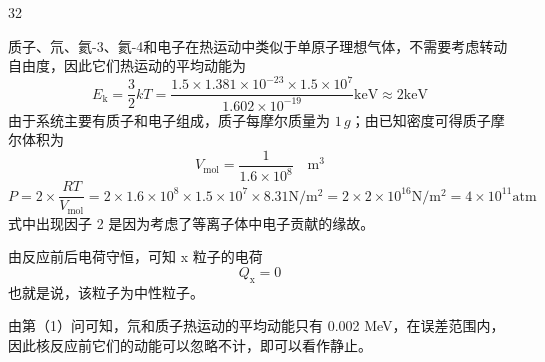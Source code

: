 \begin{solution}{32}
  \begin{subsolution}
    质子、氘、氦-3、氦-4和电子在热运动中类似于单原子理想气体，不需要考虑转动自由度，因此它们热运动的平均动能为
    \begin{equation}
      E_{\mathrm{k}} = \frac{3}{2} k T = \frac{1.5 \times 1.381 \times 10^{-23} \times 1.5 \times 10^{7}}{1.602 \times 10^{-19}} \mathrm{keV} \approx 2 \mathrm{keV}
      \label{eq:1.p32}
    \end{equation}
    由于系统主要有质子和电子组成，质子每摩尔质量为 $1 \, g$；由已知密度可得质子摩尔体积为
    \begin{equation}
      V_{\mathrm{mol}} = \frac{1}{1.6 \times 10^{8}} \quad \mathrm{m}^{3}
      \label{eq:2.p32}
    \end{equation}
    \begin{equation}
      P = 2 \times \frac{R T}{V_{\mathrm{mol}}} = 2 \times 1.6 \times 10^{8} \times 1.5 \times 10^{7} \times 8.31 \mathrm{N} / \mathrm{m}^{2} = 2 \times 2 \times 10^{16} \mathrm{N} / \mathrm{m}^{2} = 4 \times 10^{11} \mathrm{atm}
      \label{eq:3.p32}
    \end{equation}
    式中出现因子 2 是因为考虑了等离子体中电子贡献的缘故。
  \end{subsolution}
  \begin{subsolution}
    由反应前后电荷守恒，可知 x 粒子的电荷
    \begin{equation}
      Q_{\mathrm{x}} = 0
      \label{eq:4.p32}
    \end{equation}
    也就是说，该粒子为中性粒子。

    由第（1）问可知，氘和质子热运动的平均动能只有 0.002 MeV，在误差范围内，因此核反应前它们的动能可以忽略不计，即可以看作静止。


\end{subsolution}
\end{solution}
